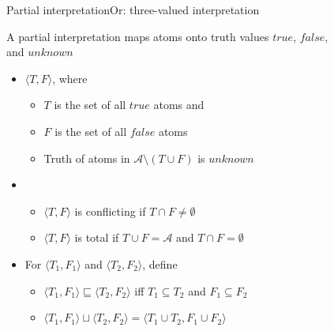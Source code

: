 \begin{frame}{Partial interpretation}{Or: three-valued interpretation}

  A \alert{partial interpretation} maps atoms onto truth values
  \alert{$\mathit{true}$}, \alert{$\mathit{false}$},\\ and \alert{$\mathit{unknown}$}
  \begin{itemize}
  \item<2->  $\langle T,F \rangle$, where
    \begin{itemize}
    \item $T$ is the set of all $\mathit{true}$ atoms and
    \item $F$ is the set of all $\mathit{false}$ atoms
    \item Truth of atoms in $\mathcal{A} \setminus (T \cup F)$ is $\mathit{unknown}$
    \end{itemize}
  \item<3-> 
    \begin{itemize}
    \item $\langle T,F \rangle$ is \alert{conflicting} if $T \cap F\neq\emptyset$
    \item $\langle T,F \rangle$ is \alert{total} if $T \cup F = \mathcal{A}$ and $T \cap F=\emptyset$
    \end{itemize}
  \item<4-> 
    For $\langle T_1,F_1\rangle$ and $\langle T_2,F_2\rangle$, define
    \begin{itemize}
    \item $\langle T_1,F_1\rangle \sqsubseteq \langle T_2,F_2\rangle$
      iff
      $T_1\subseteq T_2$ and $F_1\subseteq F_2$
    \item $\langle T_1,F_1\rangle \sqcup \langle T_2,F_2\rangle =
      \langle T_1 \cup T_2, F_1 \cup F_2 \rangle$
    \end{itemize}
  \end{itemize}
\end{frame}
%
